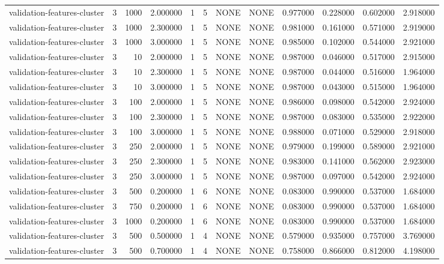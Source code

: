 \begin{tabular}{lrrrllllrrrr}
validation-features-cluster & 3 & 1000 & 2.000000 & 1 & 5 & NONE & NONE & 0.977000 & 0.228000 & 0.602000 & 2.918000 \\
validation-features-cluster & 3 & 1000 & 2.300000 & 1 & 5 & NONE & NONE & 0.981000 & 0.161000 & 0.571000 & 2.919000 \\
validation-features-cluster & 3 & 1000 & 3.000000 & 1 & 5 & NONE & NONE & 0.985000 & 0.102000 & 0.544000 & 2.921000 \\
validation-features-cluster & 3 & 10 & 2.000000 & 1 & 5 & NONE & NONE & 0.987000 & 0.046000 & 0.517000 & 2.915000 \\
validation-features-cluster & 3 & 10 & 2.300000 & 1 & 5 & NONE & NONE & 0.987000 & 0.044000 & 0.516000 & 1.964000 \\
validation-features-cluster & 3 & 10 & 3.000000 & 1 & 5 & NONE & NONE & 0.987000 & 0.043000 & 0.515000 & 1.964000 \\
validation-features-cluster & 3 & 100 & 2.000000 & 1 & 5 & NONE & NONE & 0.986000 & 0.098000 & 0.542000 & 2.924000 \\
validation-features-cluster & 3 & 100 & 2.300000 & 1 & 5 & NONE & NONE & 0.987000 & 0.083000 & 0.535000 & 2.922000 \\
validation-features-cluster & 3 & 100 & 3.000000 & 1 & 5 & NONE & NONE & 0.988000 & 0.071000 & 0.529000 & 2.918000 \\
validation-features-cluster & 3 & 250 & 2.000000 & 1 & 5 & NONE & NONE & 0.979000 & 0.199000 & 0.589000 & 2.921000 \\
validation-features-cluster & 3 & 250 & 2.300000 & 1 & 5 & NONE & NONE & 0.983000 & 0.141000 & 0.562000 & 2.923000 \\
validation-features-cluster & 3 & 250 & 3.000000 & 1 & 5 & NONE & NONE & 0.987000 & 0.097000 & 0.542000 & 2.924000 \\
validation-features-cluster & 3 & 500 & 0.200000 & 1 & 6 & NONE & NONE & 0.083000 & 0.990000 & 0.537000 & 1.684000 \\
validation-features-cluster & 3 & 750 & 0.200000 & 1 & 6 & NONE & NONE & 0.083000 & 0.990000 & 0.537000 & 1.684000 \\
validation-features-cluster & 3 & 1000 & 0.200000 & 1 & 6 & NONE & NONE & 0.083000 & 0.990000 & 0.537000 & 1.684000 \\
validation-features-cluster & 3 & 500 & 0.500000 & 1 & 4 & NONE & NONE & 0.579000 & 0.935000 & 0.757000 & 3.769000 \\
validation-features-cluster & 3 & 500 & 0.700000 & 1 & 4 & NONE & NONE & 0.758000 & 0.866000 & 0.812000 & 4.198000 \\

\end{tabular}
